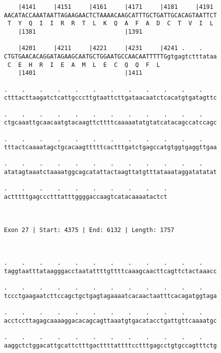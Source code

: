 \documentclass{article}
\begin{document}
\begin{Verbatim}
    |4141     |4151     |4161     |4171     |4181     |4191 
AACATACCAAATAATTAGAAGAACTCTAAAACAAGCATTTGCTGATTGCACAGTAATTCT
 T  Y  Q  I  I  R  R  T  L  K  Q  A  F  A  D  C  T  V  I  L 
    |1381                         |1391                     
  
    |4201     |4211     |4221     |4231     |4241 .    .    
CTGTGAACACAGGATAGAAGCAATGCTGGAATGCCAACAATTTTTGgtgagtctttataa
 C  E  H  R  I  E  A  M  L  E  C  Q  Q  F  L                
    |1401                         |1411                     
  
.    .    .    .    .    .    .    .    .    .    .    .    
ctttacttaagatctcattgcccttgtaattcttgataacaatctcacatgtgatagttc
                                                            
.    .    .    .    .    .    .    .    .    .    .    .    
ctgcaaattgcaacaatgtacaagttcttttcaaaaatatgtatcatacagccatccagc
                                                            
.    .    .    .    .    .    .    .    .    .    .    .    
tttactcaaaatagctgcacaagtttttcactttgatctgagccatgtggtgaggttgaa
                                                            
.    .    .    .    .    .    .    .    .    .    .    .    
atatagtaaatctaaaatggcagcatattactaagttatgtttataaataggatatatat
                                                            
.    .    .    .    .    .    .    .    .    .
actttttgagccctttatttggggaccaagtcatacaaaatactct
                                              
                                              
 
Exon 27 | Start: 4375 | End: 6132 | Length: 1757



.    .    .    .    .    .    .    .    .    .    .    .    
taggtaatttataagggacctaatattttgttttcaaagcaacttcagttctactaaacc
                                                            
.    .    .    .    .    .    .    .    .    .    .    .    
tccctgaagaatcttccagctgctgagtagaaaatcacaactaatttcacagatggtaga
                                                            
.    .    .    .    .    .    .    .    .    .    .    .    
acctccttagagcaaaaggacacagcagttaaatgtgacatacctgattgttcaaaatgc
                                                            
.    .    .    .    .    .    .    .    .    .    .    .    
aaggctctggacattgcattctttgacttttattttcctttgagcctgtgccagtttctg
                                                            

\end{Verbatim}
\end{document}
